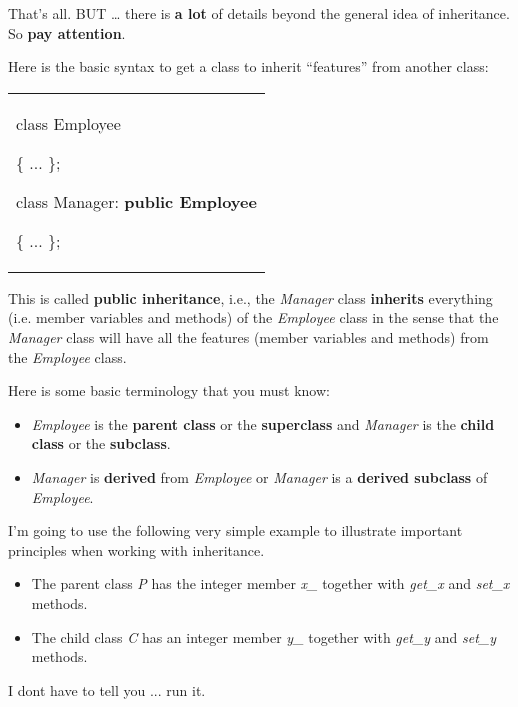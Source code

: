 \documentclass[
]{article}
\providecommand{\tightlist}{%
  \setlength{\itemsep}{0pt}\setlength{\parskip}{0pt}}
\begin{document}
That's all. BUT \ldots{} there is \textbf{a lot} of details beyond the
general idea of inheritance. So \textbf{pay attention}.

Here is the basic syntax to get a class to inherit ``features'' from
another class:

\begin{longtable}[]{@{}
  >{\raggedright\arraybackslash}p{}@{}}
\toprule\noalign{}
 \\
\midrule\noalign{}
\endhead
\bottomrule\noalign{}
\endlastfoot
class Employee

\{ ... \};

class Manager: \textbf{public Employee}

\{ ... \}; \\
\end{longtable}

This is called \textbf{public inheritance}, i.e., the \emph{Manager}
class \textbf{inherits} everything (i.e. member variables and methods)
of the \emph{Employee} class in the sense that the \emph{Manager} class
will have all the features (member variables and methods) from the
\emph{Employee} class.

Here is some basic terminology that you must know:

\begin{itemize}
\tightlist
\item
  \emph{Employee} is the \textbf{parent class} or the
  \textbf{superclass} and \emph{Manager} is the \textbf{child class} or
  the \textbf{subclass}.
\item
  \emph{Manager} is \textbf{derived} from \emph{Employee} or
  \emph{Manager} is a \textbf{derived subclass} of \emph{Employee}.
\end{itemize}

I'm going to use the following very simple example to illustrate
important principles when working with inheritance.

\begin{itemize}
\tightlist
\item
  The parent class \emph{P} has the integer member \emph{x\_} together
  with \emph{get\_x} and \emph{set\_x} methods.
\item
  The child class \emph{C} has an integer member \emph{y\_} together
  with \emph{get\_y} and \emph{set\_y} methods.
\end{itemize}

I don\textquotesingle t have to tell you ... run it.
\end{document}
